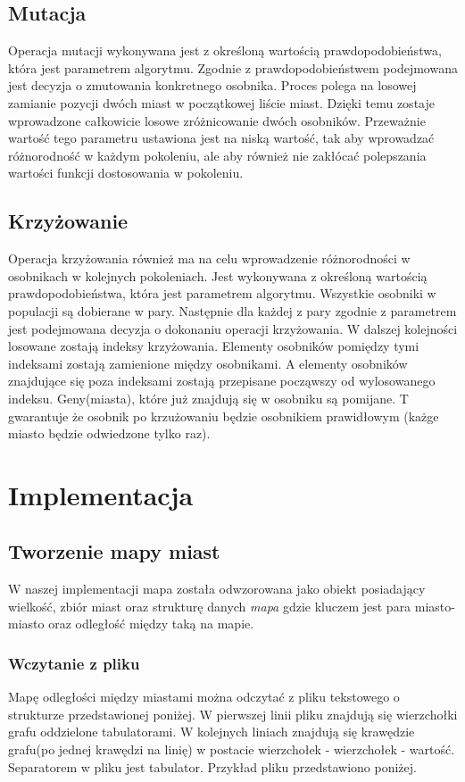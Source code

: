 \documentclass[10pt,a4paper]{article}
\begin{document}
\subsection{Mutacja}
Operacja mutacji wykonywana jest z określoną wartością prawdopodobieństwa, która jest parametrem algorytmu. Zgodnie z prawdopodobieństwem podejmowana jest decyzja o zmutowania konkretnego osobnika. Proces polega na losowej zamianie pozycji dwóch miast w początkowej liście miast. Dzięki temu zostaje wprowadzone całkowicie losowe zróżnicowanie dwóch osobników. Przeważnie wartość tego parametru ustawiona jest na niską wartość, tak aby wprowadzać różnorodność w każdym pokoleniu, ale aby również nie zakłócać polepszania wartości funkcji dostosowania w pokoleniu.

\subsection{Krzyżowanie}
Operacja krzyżowania również ma na celu wprowadzenie różnorodności w osobnikach w kolejnych pokoleniach. Jest wykonywana z określoną wartością prawdopodobieństwa, która jest parametrem algorytmu. Wszystkie osobniki w populacji są dobierane w pary. Następnie dla każdej z pary zgodnie z parametrem jest podejmowana decyzja o dokonaniu operacji krzyżowania. W dalszej kolejności losowane zostają indeksy krzyżowania. Elementy osobników pomiędzy tymi indeksami zostają zamienione między osobnikami. A elementy osobników znajdujące się poza indeksami zostają przepisane począwszy od wylosowanego indeksu. Geny(miasta), które już znajdują się w osobniku są pomijane. T gwarantuje że osobnik po krzużowaniu będzie osobnikiem prawidłowym (każge miasto będzie odwiedzone tylko raz).

\section{Implementacja}

\subsection{Tworzenie mapy miast}
W naszej implementacji mapa została odwzorowana jako obiekt posiadający wielkość, zbiór miast oraz strukturę danych \textit{mapa} gdzie kluczem jest para miasto-miasto oraz odległość między taką na mapie.

\subsubsection{Wczytanie z pliku}
Mapę odległości między miastami można odczytać z pliku tekstowego o strukturze przedstawionej poniżej. W pierwszej linii pliku znajdują się wierzchołki grafu oddzielone tabulatorami. W kolejnych liniach znajdują się krawędzie grafu(po jednej krawędzi na linię) w postacie wierzchołek - wierzchołek - wartość. Separatorem w pliku jest tabulator. Przykład pliku przedstawiono poniżej.
\end{document}

